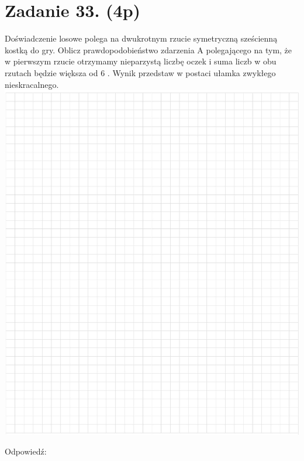 \documentclass[10pt]{article}
\begin{document}
\section*{Zadanie 33. (4p)}
Doświadczenie losowe polega na dwukrotnym rzucie symetryczną sześcienną kostką do gry. Oblicz prawdopodobieństwo zdarzenia A polegającego na tym, że w pierwszym rzucie otrzymamy nieparzystą liczbę oczek i suma liczb w obu rzutach będzie większa od 6 . Wynik przedstaw w postaci ułamka zwykłego nieskracalnego.\\
\includegraphics[max width=\textwidth, center]{2024_11_21_19ede52d758866b0d67eg-12}

Odpowiedź:
\end{document}
